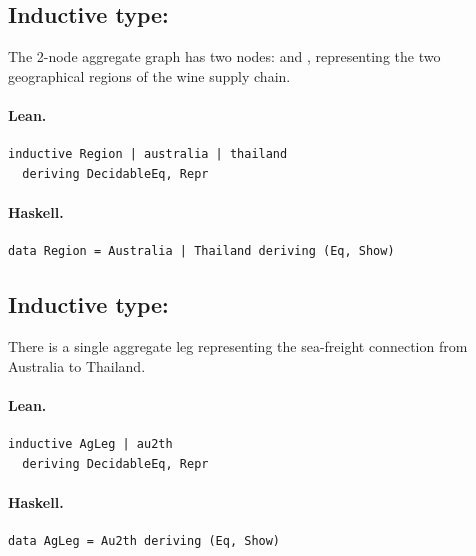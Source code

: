 \documentclass[11pt,a4paper]{article}
\begin{document}
\subsection{Inductive type: }

\begin{defn}
The 2-node aggregate graph has two nodes:  and ,
representing the two geographical regions of the wine supply chain.
\end{defn}

\paragraph{Lean.}
\begin{lstlisting}[style=lean]
inductive Region | australia | thailand
  deriving DecidableEq, Repr
\end{lstlisting}

\paragraph{Haskell.}
\begin{lstlisting}[style=haskell]
data Region = Australia | Thailand deriving (Eq, Show)
\end{lstlisting}


\subsection{Inductive type: }

\begin{defn}
There is a single aggregate leg  representing the sea-freight
connection from Australia to Thailand.
\end{defn}

\paragraph{Lean.}
\begin{lstlisting}[style=lean]
inductive AgLeg | au2th
  deriving DecidableEq, Repr
\end{lstlisting}

\paragraph{Haskell.}
\begin{lstlisting}[style=haskell]
data AgLeg = Au2th deriving (Eq, Show)
\end{lstlisting}
\end{document}
